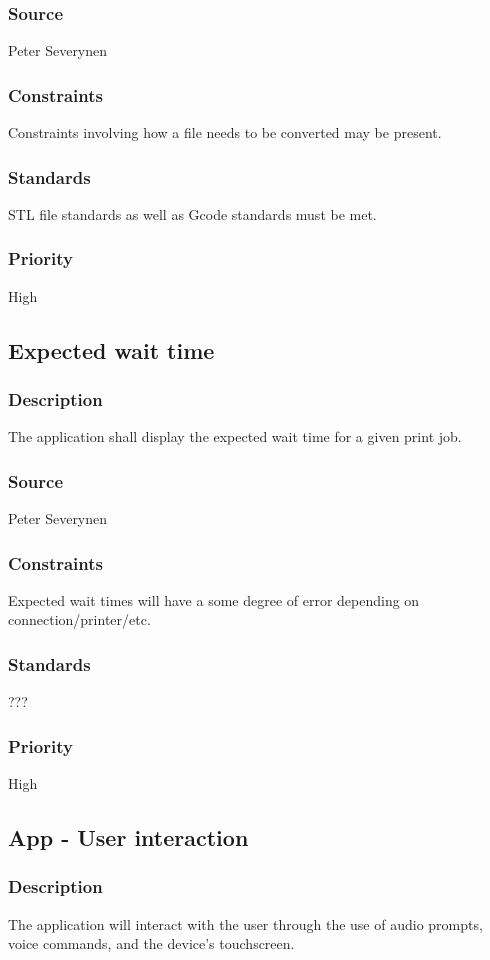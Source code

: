 \subsubsection{Source}
Peter Severynen
\subsubsection{Constraints}
Constraints involving how a file needs to be converted may be present.
\subsubsection{Standards}
STL file standards as well as Gcode standards must be met.
\subsubsection{Priority}
High
\subsection{Expected wait time}
\subsubsection{Description}
The application shall display the expected wait time for a given print job.
\subsubsection{Source}
Peter Severynen
\subsubsection{Constraints}
Expected wait times will have a some degree of error depending on connection/printer/etc.
\subsubsection{Standards}
???
\subsubsection{Priority}
High
\subsection{App - User interaction}
\subsubsection{Description}
The application will interact with the user through the use of audio prompts, voice commands, and the device's touchscreen.

